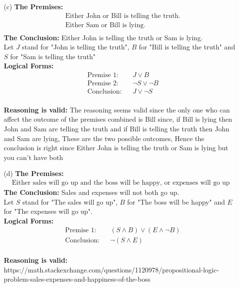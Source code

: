\documentclass{article} %
\begin{document}
\begin{enumerate}
\begin{itemize}
            \item[(c)] \textbf{The Premises:}
            \begin{align*}
                &\text{Either John or Bill is telling the truth.} \\
                &\text{Either Sam or Bill is lying.} \\
            \end{align*}
            \textbf{The Conclusion:} Either John is telling the truth or Sam is lying. \\
            Let \(J\) stand for "John is telling the truth", \(B\) for "Bill is telling the truth" and \(S\) for "Sam is telling the truth" \\
            \textbf{Logical Forms:}
            \begin{align*}
                &\text{Premise 1:} && J \vee B \\
                &\text{Premise 2:} && \neg S \vee \neg B \\
                &\text{Conclusion:} && J \vee \neg S 
            \end{align*} \\
            \textbf{Reasoning is valid:} The reasoning seems valid since the only one who can affect the outcome of the premises combined is Bill since, if Bill is lying then John and Sam are telling the truth and if Bill is telling the truth then John and Sam are lying, These are the two possible outcomes, Hence the conclusion is right since Either John is telling the truth or Sam is lying but you can't have both

            \item[(d)] \textbf{The Premises:}
            \begin{align*}
                &\text{Either sales will go up and the boss will be happy, or expenses will go up and the boss won't be happy.}
            \end{align*}
            \textbf{The Conclusion:} Sales and expenses will not both go up. \\
            Let \(S\) stand for "The sales will go up", \(B\) for "The boss will be happy" and \(E\) for "The expenses will go up". \\
            \textbf{Logical Forms:}
            \begin{align*}
                &\text{Premise 1:} && (S \wedge B) \vee (E \wedge \neg B) \\
                &\text{Conclusion:} && \neg (S \wedge E) 
            \end{align*} \\
            \textbf{Reasoning is valid:} https://math.stackexchange.com/questions/1120978/propositional-logic-problem-sales-expenses-and-happiness-of-the-boss

        \end{itemize}
    \end{enumerate}
\end{document}
